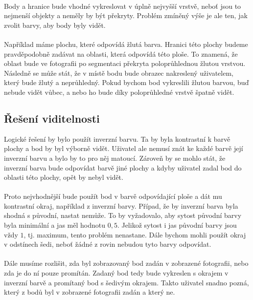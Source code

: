 \documentclass[11pt,twoside,a4paper]{book}
\begin{document}
\paragraph{}
Body a hranice bude vhodné vykreslovat v úplně nejvyšší vrstvě, neboť jsou to nejmenší objekty a neměly by být překryty. Problém zmíněný výše je ale ten, jak zvolit barvy, aby body byly vidět.
\paragraph{}
Například máme plochu, které odpovídá žlutá barva. Hranici této plochy budeme pravděpodobně zadávat na oblasti, která odpovídá této ploše. To znamená, že oblast bude ve fotografii po segmentaci překryta poloprůhlednou žlutou vrstvou. Následně se může stát, že v místě bodu bude obrazec nakreslený uživatelem, který bude žlutý a neprůhledný. Pokud bychom bod vykreslili žlutou barvou, buď nebude vidět vůbec, a nebo ho bude díky poloprůhledné vrstvě špatně vidět. 

\subsection{Řešení viditelnosti}
Logické řešení by bylo použít inverzní barvu. Ta by byla kontrastní k barvě plochy a bod by byl výborně vidět. Uživatel ale nemusí znát ke každé barvě její inverzní barvu a bylo by to pro něj matoucí. Zároveň by se mohlo stát, že inverzní barva bude odpovídat barvě jiné plochy a kdyby uživatel zadal bod do oblasti této plochy, opět by nebyl vidět.
\paragraph{}
Proto nejvhodnější bude použít bod v barvě odpovídající ploše a dát mu kontrastní okraj, například z inverzní barvy. Případ, že by inverzní barva byla shodná s původní, nastat nemůže. To by vyžadovalo, aby sytost původní barvy byla minimální a jas měl hodnotu $0,5$. Jelikož sytost i jas původní barvy jsou vždy $1$, tj. maximum, tento problém nenastane.  Dále bychom mohli použít okraj v odstínech šedi, neboť žádné z rovin nebudou tyto barvy odpovídat.
\paragraph{}
Dále musíme rozlišit, zda byl zobrazovaný bod zadán v zobrazené fotografii, nebo zda je do ní pouze promítán. Zadaný bod tedy bude vykreslen s okrajem v inverzní barvě a promítaný bod s šedivým okrajem. Takto uživatel snadno pozná, který z bodů byl v zobrazené fotografii zadán a který ne. 
\end{document}
